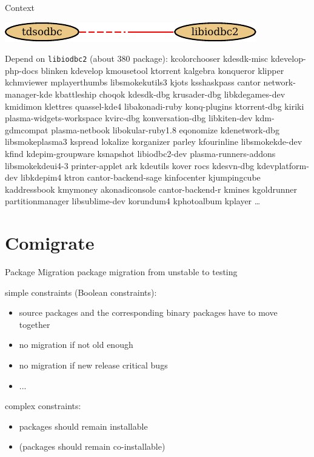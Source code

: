\documentclass[xcolor={dvipsnames}]{beamer}
\begin{document}
\begin{frame}{Context}
\begin{center}
\includegraphics{figures/libiodbc2}
\end{center}
Depend on \texttt{libiodbc2} (about 380 package):
kcolorchooser kdesdk-misc kdevelop-php-docs blinken kdevelop
kmousetool ktorrent kalgebra konqueror klipper kchmviewer
mplayerthumbs libsmokekutils3 kjots ksshaskpass cantor
network-manager-kde kbattleship choqok kdesdk-dbg krusader-dbg
libkdegames-dev kmidimon klettres quassel-kde4 libakonadi-ruby
konq-plugins ktorrent-dbg kiriki plasma-widgets-workspace kvirc-dbg
konversation-dbg libkiten-dev kdm-gdmcompat plasma-netbook
libokular-ruby1.8 eqonomize kdenetwork-dbg libsmokeplasma3 kspread
lokalize korganizer parley kfourinline libsmokekde-dev kfind
kdepim-groupware ksnapshot libiodbc2-dev plasma-runners-addons
libsmokekdeui4-3 printer-applet ark kdeutils kover rocs kdesvn-dbg
kdevplatform-dev libkdepim4 ktron cantor-backend-sage kinfocenter
kjumpingcube kaddressbook kmymoney akonadiconsole cantor-backend-r
kmines kgoldrunner partitionmanager libsublime-dev korundum4
kphotoalbum kplayer
\ldots

\end{frame}

\part{Comigrate}
\frame{\partpage}

\begin{frame}{Package Migration}
package migration from unstable to testing

simple constraints (Boolean constraints):
\begin{itemize}
\item source packages and the corresponding binary packages have to move
  together
\item no migration if not old enough
\item no migration if new release critical bugs
\item ...
\end{itemize}
complex constraints:
\begin{itemize}
\item packages should remain installable
\item (packages should remain co-installable)
\end{itemize}
\end{frame}
\end{document}
